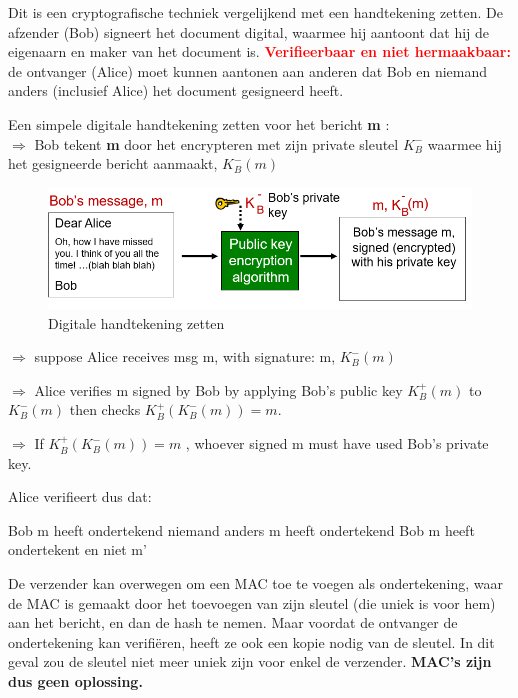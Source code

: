 Dit is een cryptografische techniek vergelijkend met een handtekening zetten.
\bi
\itf De afzender (Bob) signeert het document digital, waarmee hij aantoont dat hij de eigenaarn en maker van het document is. 
\itf \textcolor{red}{\textbf{Verifieerbaar en niet hermaakbaar:}} de ontvanger (Alice) moet kunnen aantonen aan anderen dat Bob en niemand anders (inclusief Alice) het document gesigneerd heeft.
\ei

\noindent Een simpele digitale handtekening zetten voor het bericht \textbf{m} :\\

\noindent $\Rightarrow$ Bob tekent \textbf{m} door het encrypteren met zijn private sleutel $K^-_B$ waarmee hij het gesigneerde bericht aanmaakt, $K^-_B (m)$


\begin{figure}[h]
    \centering
    \includegraphics[width=7in]{./img/imghfdst8/hfdst8puntje7.png}
    \caption{Digitale handtekening zetten }      
    \label{fig:Digitale handtekening zetten  }
\end{figure}

\noindent $\Rightarrow$ suppose Alice receives msg m, with signature: m,  $K^-_B (m)$

\noindent $\Rightarrow$ 	Alice verifies m signed by Bob by applying Bob’s public key  $K^+_B (m)$ to  $K^-_B (m)$ then checks  $K^+_B (K^-_B (m)) = m $.

\noindent $\Rightarrow$ If $K^+_B (K^-_B (m)) = m $ , whoever signed m must have used Bob’s private key.

\noindent Alice verifieert dus dat:

\bi
\itf Bob m heeft ondertekend
\itf niemand anders m heeft ondertekend
\itf Bob m heeft ondertekent en niet m'
\ei

\noindent De verzender kan overwegen om een MAC toe te voegen als ondertekening, waar de MAC is gemaakt door het toevoegen van zijn sleutel (die uniek is voor hem) aan het bericht, en dan de hash te nemen. Maar voordat de ontvanger de ondertekening kan verifiëren, heeft ze ook een kopie nodig van de sleutel. In dit geval zou de sleutel niet meer uniek zijn voor enkel de verzender. \textbf{MAC’s zijn dus geen oplossing.}


